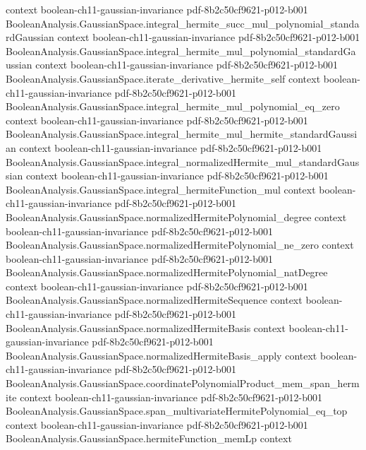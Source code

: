 \begin{theorem}
  {context}
  {boolean-ch11-gaussian-invariance}
  {pdf-8b2c50cf9621-p012-b001}
\proofstep
  {BooleanAnalysis.GaussianSpace.integral_hermite_succ_mul_polynomial_standardGaussian}
  {context}
  {boolean-ch11-gaussian-invariance}
  {pdf-8b2c50cf9621-p012-b001}
\proofstep
  {BooleanAnalysis.GaussianSpace.integral_hermite_mul_polynomial_standardGaussian}
  {context}
  {boolean-ch11-gaussian-invariance}
  {pdf-8b2c50cf9621-p012-b001}
\proofstep
  {BooleanAnalysis.GaussianSpace.iterate_derivative_hermite_self}
  {context}
  {boolean-ch11-gaussian-invariance}
  {pdf-8b2c50cf9621-p012-b001}
\proofstep
  {BooleanAnalysis.GaussianSpace.integral_hermite_mul_polynomial_eq_zero}
  {context}
  {boolean-ch11-gaussian-invariance}
  {pdf-8b2c50cf9621-p012-b001}
\proofstep
  {BooleanAnalysis.GaussianSpace.integral_hermite_mul_hermite_standardGaussian}
  {context}
  {boolean-ch11-gaussian-invariance}
  {pdf-8b2c50cf9621-p012-b001}
\proofstep
  {BooleanAnalysis.GaussianSpace.integral_normalizedHermite_mul_standardGaussian}
  {context}
  {boolean-ch11-gaussian-invariance}
  {pdf-8b2c50cf9621-p012-b001}
\proofstep
  {BooleanAnalysis.GaussianSpace.integral_hermiteFunction_mul}
  {context}
  {boolean-ch11-gaussian-invariance}
  {pdf-8b2c50cf9621-p012-b001}
\proofstep
  {BooleanAnalysis.GaussianSpace.normalizedHermitePolynomial_degree}
  {context}
  {boolean-ch11-gaussian-invariance}
  {pdf-8b2c50cf9621-p012-b001}
\proofstep
  {BooleanAnalysis.GaussianSpace.normalizedHermitePolynomial_ne_zero}
  {context}
  {boolean-ch11-gaussian-invariance}
  {pdf-8b2c50cf9621-p012-b001}
\proofstep
  {BooleanAnalysis.GaussianSpace.normalizedHermitePolynomial_natDegree}
  {context}
  {boolean-ch11-gaussian-invariance}
  {pdf-8b2c50cf9621-p012-b001}
\proofstep
  {BooleanAnalysis.GaussianSpace.normalizedHermiteSequence}
  {context}
  {boolean-ch11-gaussian-invariance}
  {pdf-8b2c50cf9621-p012-b001}
\proofstep
  {BooleanAnalysis.GaussianSpace.normalizedHermiteBasis}
  {context}
  {boolean-ch11-gaussian-invariance}
  {pdf-8b2c50cf9621-p012-b001}
\proofstep
  {BooleanAnalysis.GaussianSpace.normalizedHermiteBasis_apply}
  {context}
  {boolean-ch11-gaussian-invariance}
  {pdf-8b2c50cf9621-p012-b001}
\proofstep
  {BooleanAnalysis.GaussianSpace.coordinatePolynomialProduct_mem_span_hermite}
  {context}
  {boolean-ch11-gaussian-invariance}
  {pdf-8b2c50cf9621-p012-b001}
\proofstep
  {BooleanAnalysis.GaussianSpace.span_multivariateHermitePolynomial_eq_top}
  {context}
  {boolean-ch11-gaussian-invariance}
  {pdf-8b2c50cf9621-p012-b001}
\proofstep
  {BooleanAnalysis.GaussianSpace.hermiteFunction_memLp}
  {context}

\end{theorem}

